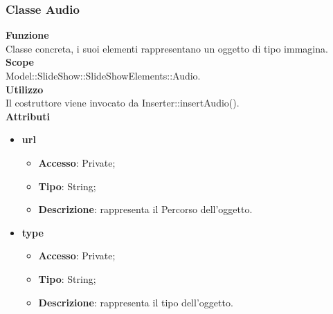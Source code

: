 {	\subsubsection{Classe Audio}{
		\label{Audio}
		\textbf{Funzione}\\
			\indent Classe concreta, i suoi elementi rappresentano un oggetto di tipo immagina.\\
	   	\textbf{Scope}\\
			\indent Model::SlideShow::SlideShowElements::Audio.\\
		\textbf{Utilizzo}\\
			\indent Il costruttore viene invocato da Inserter::insertAudio().\\
		\textbf{Attributi}
		\begin{itemize}
			\item \textbf{url}
			\begin{itemize}
				\item \textbf{Accesso}: Private;
				\item \textbf{Tipo}: String;
				\item \textbf{Descrizione}: rappresenta il Percorso dell’oggetto.
			\end{itemize}
			\item \textbf{type}
			\begin{itemize}
				\item \textbf{Accesso}: Private;
				\item \textbf{Tipo}: String;
				\item \textbf{Descrizione}: rappresenta il tipo dell'oggetto.
			\end{itemize}
		\end{itemize}
		}
	
}
